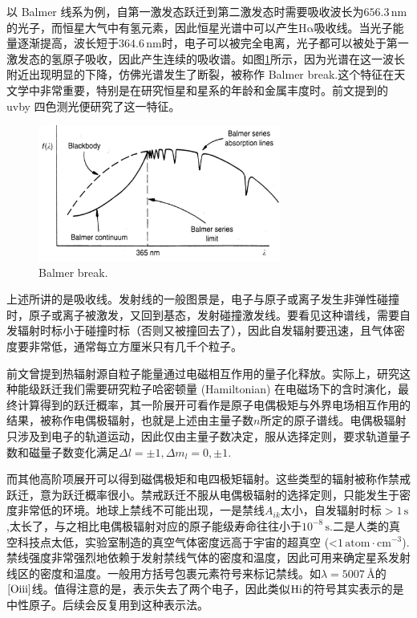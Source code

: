 \documentclass[../天体物理基础.tex]{subfiles}
\begin{document}
以 Balmer 线系为例，自第一激发态跃迁到第二激发态时需要吸收波长为$656.3\,\mathrm{nm}$的光子，而恒星大气中有氢元素，因此恒星光谱中可以产生$\mathrm{H\alpha}$吸收线。当光子能量逐渐提高，波长短于$364.6\,\mathrm{nm}$时，电子可以被完全电离，光子都可以被处于第一激发态的氢原子吸收，因此产生连续的吸收谱。如图\ref{Balmer break.}所示，因为光谱在这一波长附近出现明显的下降，仿佛光谱发生了断裂，被称作 Balmer break.这个特征在天文学中非常重要，特别是在研究恒星和星系的年龄和金属丰度时。前文提到的 uvby 四色测光便研究了这一特征。
\begin{figure}[!htbp]
\centering
\includegraphics[width=8cm]{figures/figure1_12.png}
\captionsetup{justification=raggedright, singlelinecheck=false}
\caption{Balmer break.}
\label{Balmer break.}
\end{figure}

上述所讲的是吸收线。发射线的一般图景是，电子与原子或离子发生非弹性碰撞时，原子或离子被激发，又回到基态，发射碰撞激发线。要看见这种谱线，需要自发辐射时标小于碰撞时标（否则又被撞回去了），因此自发辐射要迅速，且气体密度要非常低，通常每立方厘米只有几千个粒子。

前文曾提到热辐射源自粒子能量通过电磁相互作用的量子化释放。实际上，研究这种能级跃迁我们需要研究粒子哈密顿量 (Hamiltonian) 在电磁场下的含时演化，最终计算得到的跃迁概率，其一阶展开可看作是原子电偶极矩与外界电场相互作用的结果，被称作电偶极辐射，也就是上述由主量子数$n$所定的原子谱线。电偶极辐射只涉及到电子的轨道运动，因此仅由主量子数决定，服从选择定则，要求轨道量子数和磁量子数变化满足$\Delta{}l=\pm1,\Delta{}m_{l}=0,\pm1$.

而其他高阶项展开可以得到磁偶极矩和电四极矩辐射。这些类型的辐射被称作禁戒跃迁，意为跃迁概率很小。禁戒跃迁不服从电偶极辐射的选择定则，只能发生于密度非常低的环境。地球上禁线不可能出现，一是禁线$A_{ik}$太小，自发辐射时标$>1\,\mathrm{s}$,太长了，与之相比电偶极辐射对应的原子能级寿命往往小于$10^{-8}\,\mathrm{s}$.二是人类的真空科技点太低，实验室制造的真空气体密度远高于宇宙的超真空 (<$1\,\mathrm{atom\cdot cm^{-3}}$).禁线强度非常强烈地依赖于发射禁线气体的密度和温度，因此可用来确定星系发射线区的密度和温度。一般用方括号包裹元素符号来标记禁线。如$\lambda=5007\,\si{\angstrom}$的$\mathrm{[O\uppercase\expandafter{\romannumeral3}]}$线。值得注意的是，\uppercase\expandafter{}表示失去了两个电子，因此类似$\mathrm{H\uppercase\expandafter{\romannumeral1}}$的符号其实表示的是中性原子。后续会反复用到这种表示法。
\end{document}
